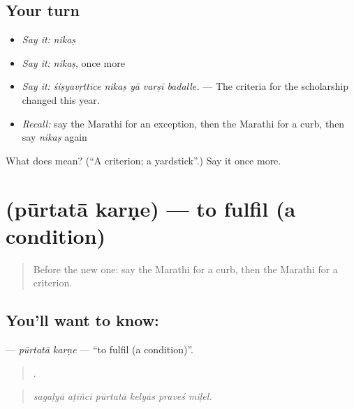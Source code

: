 \subsection*{Your turn}
\begin{itemize}
\raggedright
  \item \emph{Say it:} \emph{nikaṣ}
  \item \emph{Say it:} \emph{nikaṣ}, once more
  \item \emph{Say it:} \emph{śiṣyavṛttīce nikaṣ yā varṣī badalle.} — The criteria for the scholarship changed this year.
  \item \emph{Recall:} say the Marathi for an exception, then the Marathi for a curb, then say \emph{nikaṣ} again
\end{itemize}

\begin{tcolorbox}[breakable,colback=teal!4,colframe=teal!35!black,title={Before you move on}]
What does  mean? (\textquotedblleft{}A criterion; a yardstick\textquotedblright{}.) Say it once more.
\end{tcolorbox}
\section[\texorpdfstring{\mr{पूर्तता} \mr{करणे} (pūrtatā karṇe)}{पूर्तता करणे (pūrtatā karṇe)}]{  (pūrtatā karṇe) — to fulfil (a condition)}

\label{lesson:MR-C378-purtata-karne}



\begin{quote}
Before the new one: say the Marathi for a curb, then the Marathi for a criterion.
\end{quote}

\subsection*{You'll want to know:  }
\textbf{ } — \emph{pūrtatā karṇe} — \textquotedblleft{}to fulfil (a condition)\textquotedblright{}.

\begin{quote}
     .
\end{quote}

\begin{quote}
\emph{sagaḷyā aṭīñcī pūrtatā kelyās praveś miḷel.}
\end{quote}

